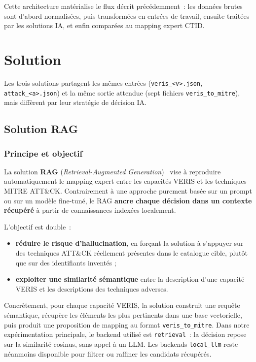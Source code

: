 \documentclass[a4paper,12pt]{article}
\begin{document}
\noindent
Cette architecture matérialise le flux décrit précédemment~: les données brutes
sont d'abord normalisées, puis transformées en entrées de travail, ensuite traitées
par les solutions IA, et enfin comparées au mapping expert CTID.

\section{Solution}

Les trois solutions partagent les mêmes entrées (\texttt{veris\_<v>.json},
\texttt{attack\_<a>.json}) et la même sortie attendue (sept fichiers
\texttt{veris\_to\_mitre}), mais diffèrent par leur stratégie de décision IA.

\subsection{Solution RAG}

\subsubsection{Principe et objectif}

La solution \textbf{RAG} (\emph{Retrieval-Augmented Generation})~\cite{lewis2020rag}
vise à reproduire automatiquement le mapping expert entre les capacités VERIS et
les techniques MITRE ATT\&CK. Contrairement à une approche purement basée sur un
prompt ou sur un modèle fine-tuné, le RAG \textbf{ancre chaque décision dans un
contexte récupéré} à partir de connaissances indexées localement.

L'objectif est double~:
\begin{itemize}
    \item \textbf{réduire le risque d'hallucination}, en forçant la solution à
          s'appuyer sur des techniques ATT\&CK réellement présentes dans le catalogue
          cible, plutôt que sur des identifiants inventés ;
    \item \textbf{exploiter une similarité sémantique} entre la description d'une
          capacité VERIS et les descriptions des techniques adverses.
\end{itemize}

Concrètement, pour chaque capacité VERIS, la solution construit une requête
sémantique, récupère les éléments les plus pertinents dans une base vectorielle,
puis produit une proposition de mapping au format \texttt{veris\_to\_mitre}. Dans
notre expérimentation principale, le backend utilisé est \texttt{retrieval}~: la
décision repose sur la similarité cosinus, sans appel à un LLM. Les backends
\texttt{local\_llm} reste néanmoins disponible pour filtrer ou raffiner les
candidats récupérés.
\end{document}
